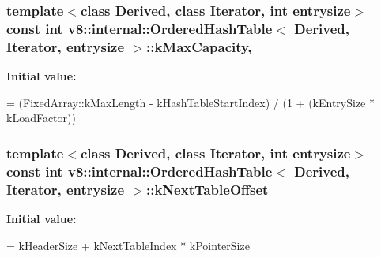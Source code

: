 \subsubsection[{\texorpdfstring{k\+Max\+Capacity}{kMaxCapacity}}]{\setlength{\rightskip}{0pt plus 5cm}template$<$class Derived, class Iterator, int entrysize$>$ const int {\bf v8\+::internal\+::\+Ordered\+Hash\+Table}$<$ Derived, Iterator, entrysize $>$\+::k\+Max\+Capacity\hspace{0.3cm}{\ttfamily [static]}, {\ttfamily [protected]}}\hypertarget{classv8_1_1internal_1_1_ordered_hash_table_a938554e291ae7e6193acfb8349016cd9}{}\label{classv8_1_1internal_1_1_ordered_hash_table_a938554e291ae7e6193acfb8349016cd9}
{\bfseries Initial value\+:}
\begin{DoxyCode}
=
      (FixedArray::kMaxLength - kHashTableStartIndex)
      / (1 + (kEntrySize * kLoadFactor))
\end{DoxyCode}
\subsubsection[{\texorpdfstring{k\+Next\+Table\+Offset}{kNextTableOffset}}]{\setlength{\rightskip}{0pt plus 5cm}template$<$class Derived, class Iterator, int entrysize$>$ const int {\bf v8\+::internal\+::\+Ordered\+Hash\+Table}$<$ Derived, Iterator, entrysize $>$\+::k\+Next\+Table\+Offset\hspace{0.3cm}{\ttfamily [static]}}\hypertarget{classv8_1_1internal_1_1_ordered_hash_table_ad517b11c10eb10e9e36db5a137495028}{}\label{classv8_1_1internal_1_1_ordered_hash_table_ad517b11c10eb10e9e36db5a137495028}
{\bfseries Initial value\+:}
\begin{DoxyCode}
=
      kHeaderSize + kNextTableIndex * kPointerSize
\end{DoxyCode}
